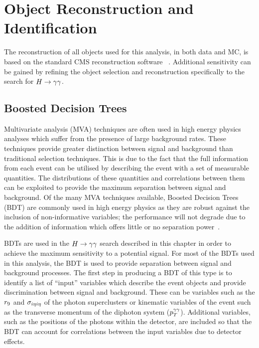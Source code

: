 \section{Object Reconstruction and Identification}
\label{sec:objectrecoandid}

The reconstruction of all objects used for this analysis, in both data and MC,
is based on the standard CMS reconstruction software \texttt{\cmssw}~\citep{cmssw}. 
Additional sensitivity can be gained by refining the object selection and reconstruction specifically
to the search for $H\rightarrow\gamma\gamma$.

\subsection{Boosted Decision Trees}
\label{sec:bdts}
Multivariate analysis (MVA) techniques are often used in high energy physics analyses
which suffer from the presence of large background rates. These techniques provide
greater distinction between signal and background than traditional selection 
techniques. This is due to the fact that the full information from each event 
can be utilised by describing the event with a set of measurable quantities. 
The distributions of these quantities and correlations between them can be 
exploited to provide the maximum separation between signal and background.
Of the many MVA techniques available, Boosted Decision Trees (BDT) are commonly used 
in high energy physics as they are robust against the inclusion of non-informative variables; 
the performance will not degrade due to the addition of information which offers little or no 
separation power~\citep{tmva}.
 

BDTs are used in the $H\rightarrow\gamma\gamma$ search described in this
chapter in order to achieve the maximum sensitivity to a potential signal.
For most of the BDTs used in this analysis, the BDT is used to provide 
separation between signal and background processes. 
The first step in producing a BDT of this type is to identify a list of ``input'' 
variables which describe the event objects and provide discrimination 
between signal and background.  
These can be variables such as the $r_{9}$ and $\sigma_{i\eta i\eta}$ 
of the photon superclusters or kinematic variables of the event such as
the transverse momentum of the diphoton system ($p_{T}^{\gamma\gamma}$). 
Additional variables, such as the positions of the photons within the detector, 
are included so that the BDT can account for correlations between the 
input variables due to detector effects.

